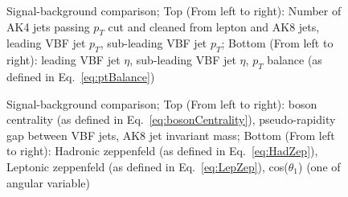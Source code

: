 \begin{figure}[h!]\ContinuedFloat
	 \caption{Signal-background comparison; Top (From left to right): Number of AK4 jets passing $p_T$ cut and cleaned from lepton and AK8 jets, leading VBF jet $p_T$, sub-leading VBF jet $p_T$; Bottom (From left to right): leading VBF jet $\eta$, sub-leading VBF jet $\eta$, $p_T$ balance (as defined in Eq.~\ref{eq:ptBalance})}
\end{figure}
\begin{figure}[h!]\ContinuedFloat
	 \caption{Signal-background comparison; Top (From left to right): boson centrality (as defined in Eq.~\ref{eq:bosonCentrality}), pseudo-rapidity gap between VBF jets, AK8 jet invariant mass; Bottom (From left to right): Hadronic zeppenfeld (as defined in Eq.~\ref{eq:HadZep}), Leptonic zeppenfeld (as defined in Eq.~\ref{eq:LepZep}), cos($\theta_1$) (one of angular variable)}
\end{figure}
